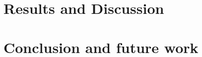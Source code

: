 \documentclass[titlepage,oneside,12pt]{article}
\newcommand{\?}{\stackrel{?}{=}}
\begin{document}
\section{Results and Discussion}



\section{Conclusion and future work}

 




\end{document}
